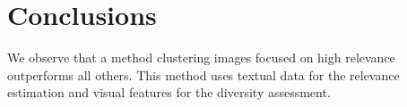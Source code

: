 \documentclass{acm_proc_article-me11_tweaked}
\begin{document}

\section{Conclusions}
We observe that a method clustering images focused on high relevance outperforms all others.
This method uses textual data for the relevance estimation and visual features for the diversity assessment.

%

\end{document}
